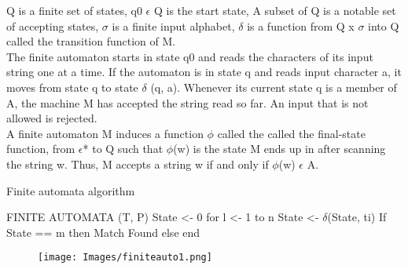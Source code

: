 \documentclass[11pt,a4paper]{article}
\begin{document}
Q is a finite set of states,
q0 \begin{math}\epsilon\end{math} Q is the start state,
A subset of Q is a notable set of accepting states,
\begin{math}\sigma\end{math} is a finite input alphabet,
\begin{math}\delta\end{math} is a function from Q x \begin{math}\sigma\end{math} into Q called the transition function of M.
\\
The finite automaton starts in state q0 and reads the characters of its input string one at a time. If the automaton is in state q and reads input character a, it moves from state q to state \begin{math}\delta\end{math} (q, a). Whenever its current state q is a member of A, the machine M has accepted the string read so far. An input that is not allowed is rejected.
\\
A finite automaton M induces a function \begin{math}\phi\end{math} called the called the final-state function, from \begin{math}\epsilon\end{math}* to Q such that \begin{math}\phi\end{math}(w) is the state M ends up in after scanning the string w. Thus, M accepts a string w if and only if \begin{math}\phi\end{math}(w) \begin{math}\epsilon\end{math} A.

\begin{algorithm}[H]
\caption*{Finite automata algorithm}
\label{psuedocode}
\begin{algorithmic}
\STATE FINITE AUTOMATA (T, P)
\STATE State <- 0
\STATE for l <- 1 to n
\STATE State <- \begin{math}\delta\end{math}(State, ti)
\STATE If State == m then
\STATE Match Found
\STATE else
\STATE end
\end{algorithmic}
\end{algorithm}

\begin{figure}[H]
    \centering
    \texttt{[image: Images/finiteauto1.png]}
    \label{fig:StoringExample}
\end{figure}
\end{document}
